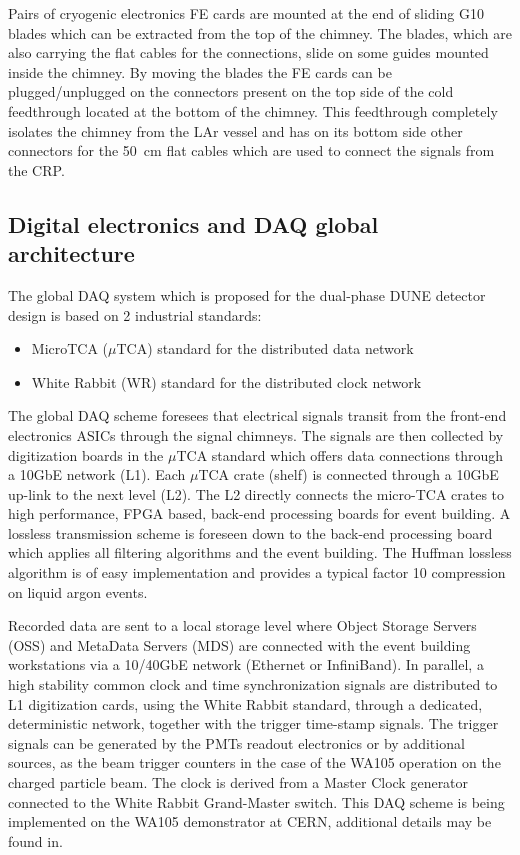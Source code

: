 Pairs of cryogenic electronics FE cards are mounted at the end of sliding G10 blades which can be extracted from the top of the
chimney. The blades, which are also carrying the flat cables for the connections, slide on some guides mounted inside the chimney. By
moving the blades the FE cards can be plugged/unplugged on the connectors present on the top side of the cold feedthrough located at
the bottom of the chimney. This feedthrough completely isolates the chimney from the LAr vessel and has on its bottom side other
connectors for the 50~cm flat cables which are used to connect the signals from the CRP.

\subsection{Digital electronics and DAQ global architecture}

The global DAQ system which is proposed for the dual-phase DUNE
detector design is based on 2 industrial standards:
\begin{itemize}
\item MicroTCA ($\mu$TCA) standard for the distributed data network \cite{mTCA-standard}
\item White Rabbit (WR) standard for the distributed clock network \cite{WR-standard}
\end{itemize}

The global DAQ scheme foresees that electrical signals transit from the front-end electronics ASICs through the signal chimneys. The
signals are then collected by digitization boards in the $\mu$TCA standard which offers data connections through a 10GbE network
(L1). Each $\mu$TCA crate (shelf) is connected through a 10GbE up-link to the next level (L2). The L2 directly connects the micro-TCA crates
to high performance, FPGA based, back-end processing boards for event building. A lossless transmission scheme is foreseen down to the
back-end processing board which applies all filtering algorithms and the event building. The Huffman lossless algorithm is of easy
implementation and provides a typical factor 10 compression on liquid argon events.

Recorded data are sent to a local storage level where Object Storage Servers (OSS) and MetaData Servers (MDS) are connected with the event
building workstations via a 10/40GbE network (Ethernet or InfiniBand). In parallel, a high stability common clock and time
synchronization signals are distributed to L1 digitization cards, using the White Rabbit standard, through a dedicated, deterministic
network, together with the trigger time-stamp signals. The trigger signals can be generated by the PMTs readout electronics or by
additional sources, as the beam trigger counters in the case of the WA105 operation on the charged particle beam. The clock is derived
from a Master Clock generator connected to the White Rabbit Grand-Master switch. This DAQ scheme is being implemented on the WA105
demonstrator at CERN, additional details may be found in\cite{WA105_TDR}.

